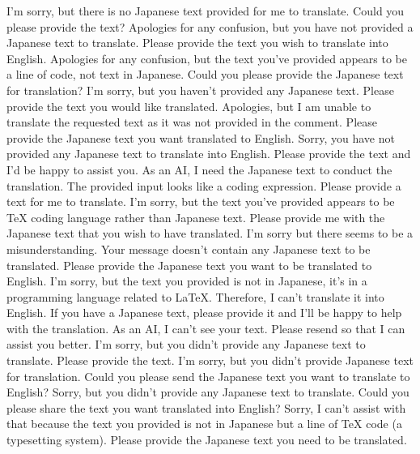 {I'm sorry, but there is no Japanese text provided for me to translate. Could you please provide the text?
Apologies for any confusion, but you have not provided a Japanese text to translate. Please provide the text you wish to translate into English.
Apologies for any confusion, but the text you've provided appears to be a line of code, not text in Japanese. Could you please provide the Japanese text for translation?
I'm sorry, but you haven't provided any Japanese text. Please provide the text you would like translated.
Apologies, but I am unable to translate the requested text as it was not provided in the comment. Please provide the Japanese text you want translated to English.
Sorry, you have not provided any Japanese text to translate into English. Please provide the text and I'd be happy to assist you.
As an AI, I need the Japanese text to conduct the translation. The provided input looks like a coding expression. Please provide a text for me to translate.
I'm sorry, but the text you've provided appears to be TeX coding language rather than Japanese text. Please provide me with the Japanese text that you wish to have translated.
I'm sorry but there seems to be a misunderstanding. Your message doesn't contain any Japanese text to be translated. Please provide the Japanese text you want to be translated to English.
I'm sorry, but the text you provided is not in Japanese, it's in a programming language related to LaTeX. Therefore, I can't translate it into English. If you have a Japanese text, please provide it and I'll be happy to help with the translation.
As an AI, I can't see your text. Please resend so that I can assist you better.
I'm sorry, but you didn't provide any Japanese text to translate. Please provide the text.
I'm sorry, but you didn't provide Japanese text for translation. Could you please send the Japanese text you want to translate to English?
Sorry, but you didn't provide any Japanese text to translate. Could you please share the text you want translated into English?
Sorry, I can't assist with that because the text you provided is not in Japanese but a line of TeX code (a typesetting system). Please provide the Japanese text you need to be translated.
}
